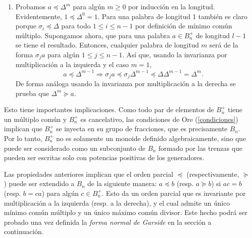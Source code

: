 \documentclass[TFG.tex]{subfiles}
\begin{document}
\begin{dem}
\begin{enumerate}
\item Probamos $a\preccurlyeq\Delta^m$ para algún $m\geq 0$ por inducción en la longitud. Evidentemente, $1\preccurlyeq\Delta^0=1$. Para una palabra de longitud 1 también es claro porque $\sigma_i\preccurlyeq\Delta$ para todo $1\leq i\leq n-1$ por definición de mínimo común múltiplo. Supongamos ahora, que para una palabra $a\in B_n^+$ de longitud $l-1$ se tiene el resultado. Entonces, cualquier palabra de longitud $m$ será de la forma $\sigma_j a$ para algún $1\leq j\leq n-1$. Así que, usando la invarianza por multiplicación a la izquierda y el caso $m=1$,
\[
a\preccurlyeq\Delta^{m-1}\Rightarrow \sigma_j a\preccurlyeq \sigma_j\Delta^{m-1} \preccurlyeq \Delta\Delta^{m-1}=\Delta^{m}.
\]
De forma análoga usando la invarianza por multiplicación a la derecha se prueba que $\Delta^m\succcurlyeq a$.
\end{enumerate}
\QED
\end{dem}



Esto tiene importantes implicaciones. Como todo par de elementos de $B_n^+$ tiene un múltiplo común y $B_n^+$ es cancelativo, las condiciones de Ore (\ref{condiciones}) implican que $B_n^+$ se inyecta en su grupo de fracciones, que es precisamente $B_n$. Por lo tanto, $B_n^+$ no es solamente un monoide definido algebraicamente, sino que puede ser considerado como un subconjunto de $B_n$ formado por las trenzas que pueden ser escritas solo con potencias positivas de los generadores. 

Las propiedades anteriores implican que el orden parcial $\preccurlyeq$ (respectivamente, $\succcurlyeq$) puede ser extendido a $B_n$ de la siguiente manera: $a\preccurlyeq b$ (resp. $a\succcurlyeq b$) si $ac=b$ (resp. $b=ca$) para algún $c\in B_n^+$. Esto da un orden parcial que es invariante por multiplicación a la izquierda (resp. a la derecha), y el cual admite un único mínimo común múltiplo y un único máximo común divisor. Este hecho podrá ser probado una vez definida la \emph{forma normal de Garside} en la sección a continuación.
\end{document}
